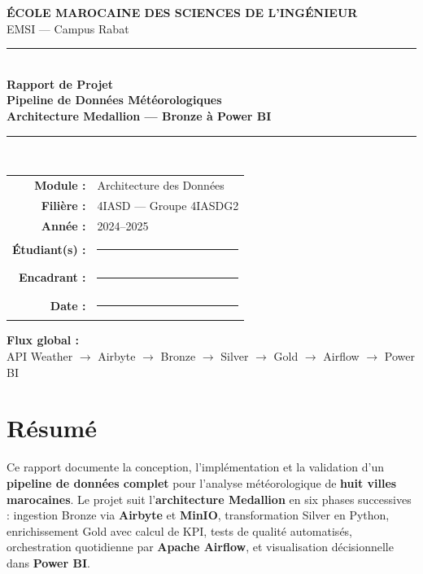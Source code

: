 \documentclass[12pt,a4paper]{report}
\begin{document}
\begin{titlepage}
\centering
\vspace*{0.8cm}
{\Large\textbf{ÉCOLE MAROCAINE DES SCIENCES DE L'INGÉNIEUR}}\\[0.2cm]
{\large EMSI — Campus Rabat}\\[1.8cm]
\rule{\linewidth}{1.5pt}\\[0.4cm]
{\Huge\bfseries\color{emsiBlue} Rapport de Projet}\\[0.3cm]
{\LARGE\bfseries Pipeline de Données Météorologiques}\\[0.15cm]
{\LARGE\bfseries Architecture Medallion — Bronze à Power BI}\\[0.4cm]
\rule{\linewidth}{1.5pt}\\[1.5cm]

\begin{tabular}{rl}
\textbf{Module :} & Architecture des Données \\[0.4cm]
\textbf{Filière :} & 4IASD — Groupe 4IASDG2 \\[0.4cm]
\textbf{Année :} & 2024--2025 \\[0.4cm]
\textbf{Étudiant(s) :} & \rule{7.5cm}{0.4pt} \\[0.5cm]
\textbf{Encadrant :} & \rule{7.5cm}{0.4pt} \\[0.5cm]
\textbf{Date :} & \rule{7.5cm}{0.4pt} \\
\end{tabular}

\vfill
{\large\textbf{Flux global :}}\\[0.2cm]
{\small
API Weather $\rightarrow$ Airbyte $\rightarrow$ Bronze $\rightarrow$ Silver $\rightarrow$ Gold $\rightarrow$ Airflow $\rightarrow$ Power BI
}
\vspace{1cm}
\end{titlepage}

\chapter*{Résumé}

Ce rapport documente la conception, l'implémentation et la validation d'un \textbf{pipeline de données complet} pour l'analyse météorologique de \textbf{huit villes marocaines}. Le projet suit l'\textbf{architecture Medallion} en six phases successives : ingestion Bronze via \textbf{Airbyte} et \textbf{MinIO}, transformation Silver en Python, enrichissement Gold avec calcul de KPI, tests de qualité automatisés, orchestration quotidienne par \textbf{Apache Airflow}, et visualisation décisionnelle dans \textbf{Power BI}.
\end{document}
